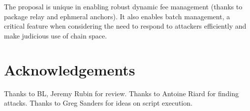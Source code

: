 \documentclass[10pt]{article}
\begin{document}
The \opv{} proposal is unique in enabling robust dynamic fee management (thanks to
package relay and ephmeral anchors). It also enables batch management, a
critical feature when considering the need to respond to attackers efficiently and make
judicious use of chain space.


\section*{Acknowledgements}

Thanks to BL, Jeremy Rubin for review. Thanks to Antoine Riard for finding attacks.
Thanks to Greg Sanders for ideas on script execution.

\printbibliography
\end{document}
